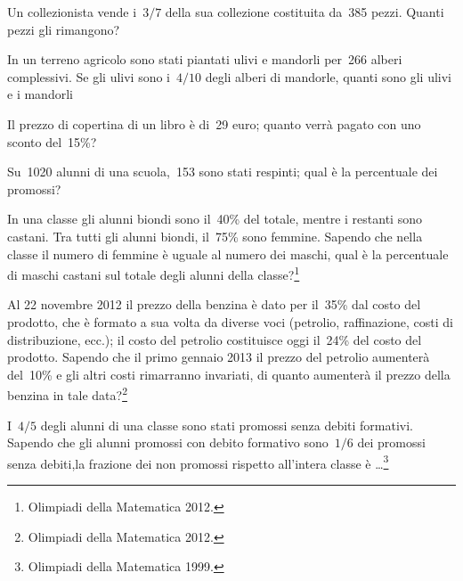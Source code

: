 \begin{multicols}{2}
\begin{esercizio}[\Ast]%
 Un collezionista vende i~$3/7$ della sua collezione costituita da~385
pezzi. Quanti pezzi gli rimangono?
\end{esercizio}

\begin{esercizio}[\Ast]%
 In un terreno agricolo sono stati piantati ulivi e mandorli per~266
alberi complessivi. Se gli ulivi sono i~$4/10$ degli alberi di mandorle,
quanti sono gli ulivi e i mandorli
\end{esercizio}

\begin{esercizio}[\Ast]%
Il prezzo di copertina di un libro è di~29 euro; quanto verrà
pagato con uno sconto del~15\%?
\end{esercizio}

\begin{esercizio}[\Ast]%
Su~1020 alunni di una scuola,~153 sono stati respinti; qual è la
percentuale dei promossi?
\end{esercizio}

\begin{esercizio}[\Ast]%
In una classe gli alunni biondi sono il~40\% del totale, mentre i restanti sono castani. Tra tutti gli alunni biondi, il~75\% sono femmine. Sapendo che nella classe il numero di femmine è uguale al numero dei maschi, qual è la percentuale di maschi castani sul totale degli alunni della classe?\footnote{Olimpiadi della Matematica 2012.}
\end{esercizio}

\begin{esercizio}[\Ast]%
Al 22 novembre 2012 il prezzo della benzina è dato per il~35\% dal costo del prodotto, che è formato a sua volta da diverse voci (petrolio, raffinazione, costi di distribuzione, ecc.); il costo del petrolio costituisce oggi il~24\% del costo del prodotto. Sapendo che il primo gennaio 2013 il prezzo del petrolio aumenterà del~10\% e gli altri costi rimarranno invariati, di quanto aumenterà il prezzo della benzina in tale data?\footnote{Olimpiadi della Matematica 2012.}
\end{esercizio}

\begin{esercizio}[\Ast]%
I~$4/5$ degli alunni di una classe sono stati promossi senza debiti formativi. Sapendo che gli alunni promossi con debito formativo sono~$1/6$ dei promossi senza debiti,la frazione dei non promossi rispetto all'intera classe è \ldots \footnote{Olimpiadi della Matematica 1999.}
\end{esercizio}


\end{multicols}
